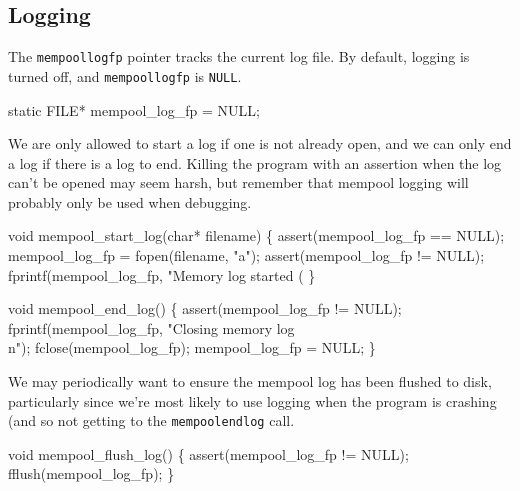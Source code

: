 \nwendcode{}\nwdocspar


\subsection{Logging}

The {\tt{}mempool{}log{}fp} pointer tracks the current log file.  By default,
logging is turned off, and {\tt{}mempool{}log{}fp} is {\tt{}NULL}.

\nwenddocs{}\endmoddef
static FILE* mempool_log_fp = NULL;
\nwendcode{}\nwdocspar

We are only allowed to start a log if one is not already open,
and we can only end a log if there is a log to end.  Killing
the program with an assertion when the log can't be opened
may seem harsh, but remember that mempool logging will probably
only be used when debugging.

\nwenddocs{}\plusendmoddef
void mempool_start_log(char* filename)
\{
    assert(mempool_log_fp == NULL);
    mempool_log_fp = fopen(filename, "a");
    assert(mempool_log_fp != NULL);
    fprintf(mempool_log_fp, "Memory log started (%
\}

\nwendcode{}\nwdocspar

\nwenddocs{}\plusendmoddef
void mempool_end_log()
\{
    assert(mempool_log_fp != NULL);
    fprintf(mempool_log_fp, "Closing memory log\\n");
    fclose(mempool_log_fp);
    mempool_log_fp = NULL;
\}

\nwendcode{}\nwdocspar

We may periodically want to ensure the mempool log has been flushed
to disk, particularly since we're most likely to use logging when
the program is crashing (and so not getting to the {\tt{}mempool{}end{}log}
call.

\nwenddocs{}\plusendmoddef
void mempool_flush_log()
\{
    assert(mempool_log_fp != NULL);
    fflush(mempool_log_fp);
\}

